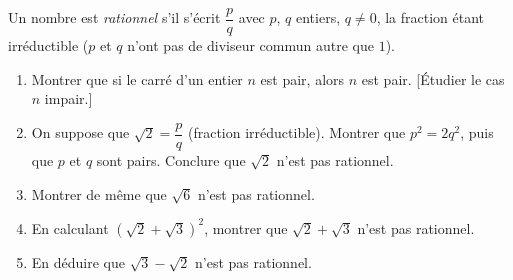 
Un nombre est \emph{rationnel} s'il s'écrit $\dfrac pq$ avec $p$, $q$ entiers, $q\neq0$, la fraction étant irréductible ($p$ et $q$ n'ont pas de diviseur commun autre que $1$).
\begin{enumerate}
  \item Montrer que si le carré d'un entier $n$ est pair, alors $n$ est pair. [Étudier le cas $n$ impair.]
  \item On suppose que $\sqrt2=\dfrac pq$ (fraction irréductible). Montrer que $p^2=2q^2$, puis que $p$ et $q$ sont pairs. Conclure que $\sqrt2$ n'est pas rationnel.
  \item Montrer de même que $\sqrt6$ n'est pas rationnel.
  \item En calculant $(\sqrt2+\sqrt3)^2$, montrer que $\sqrt2+\sqrt3$ n'est pas rationnel.
  \item En déduire que $\sqrt3-\sqrt2$ n'est pas rationnel.
\end{enumerate}

